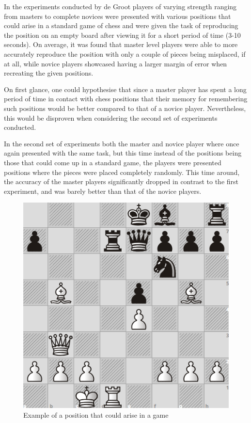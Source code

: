 In the experiments conducted by de Groot \cite{deGroot} players of varying strength ranging from masters to complete novices were presented with various positions that could arise in a standard game of chess and were given the task of reproducing the position on an empty board after viewing it for a short period of time (3-10 seconds). On average, it was found that master level players were able to more accurately reproduce the position with only a couple of pieces being misplaced, if at all, while novice players showcased having a larger margin of error when recreating the given positions.

On first glance, one could hypothesise that since a master player has spent a long period of time in contact with chess positions that their memory for remembering such positions would be better compared to that of a novice player. Nevertheless, this would be disproven when considering the second set of experiments conducted.

In the second set of experiments both the master and novice player where once again presented with the same task, but this time instead of the positions being those that could come up in a standard game, the players were presented positions where the pieces were placed completely randomly. This time around, the accuracy of the master players significantly dropped in contrast to the first experiment, and was barely better than that of the novice players.

\begin{figure}[H]
    \centering
    \includegraphics[scale=0.45]{images/MorphyPosition.png}
    \caption{Example of a position that could arise in a game}
    \label{MorphyPosition}
\end{figure}

